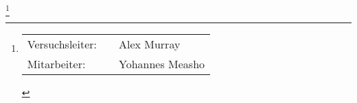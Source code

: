 \newcommand\blfootnote[1]{%
    \begingroup
    \renewcommand\thefootnote{}\footnote{#1}%
    \addtocounter{footnote}{-1}%
    \endgroup
}

\begin{titlepage}
    \maketitle
    \blfootnote{%
        \large
        \begin{tabular}{lcl}
            Versuchsleiter: & \hspace{5mm} & Alex Murray \\
            Mitarbeiter:    &              & Yohannes Measho \\
        \end{tabular}
    }
\end{titlepage}

